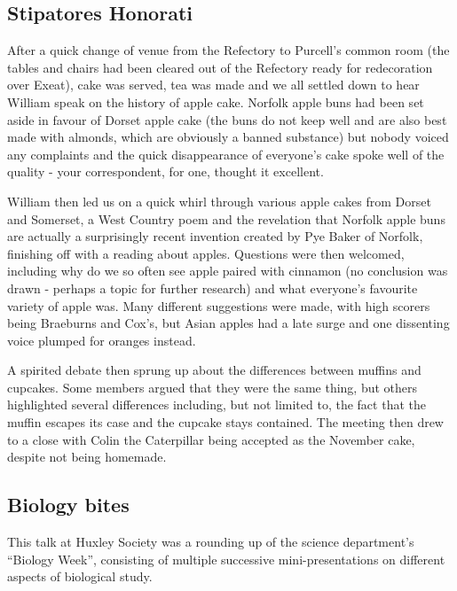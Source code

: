 \subsection{Stipatores Honorati}\label{stipatores-honorati}



	After a quick change of venue from the Refectory to Purcell's common
	room (the tables and chairs had been cleared out of the Refectory ready
	for redecoration over Exeat), cake was served, tea was made and we all
	settled down to hear William speak on the history of apple cake. Norfolk
	apple buns had been set aside in favour of Dorset apple cake (the buns
	do not keep well and are also best made with almonds, which are
	obviously a banned substance) but nobody voiced any complaints and the
	quick disappearance of everyone's cake spoke well of the quality - your
	correspondent, for one, thought it excellent.

	William then led us on a quick whirl through various apple cakes from
	Dorset and Somerset, a West Country poem and the revelation that Norfolk
	apple buns are actually a surprisingly recent invention created by Pye
	Baker of Norfolk, finishing off with a reading about apples. Questions
	were then welcomed, including why do we so often see apple paired with
	cinnamon (no conclusion was drawn - perhaps a topic for further
	research) and what everyone's favourite variety of apple was. Many
	different suggestions were made, with high scorers being Braeburns and
	Cox's, but Asian apples had a late surge and one dissenting voice
	plumped for oranges instead.

	A spirited debate then sprung up about the differences between muffins
	and cupcakes. Some members argued that they were the same thing, but
	others highlighted several differences including, but not limited to,
	the fact that the muffin escapes its case and the cupcake stays
	contained. The meeting then drew to a close with Colin the Caterpillar
	being accepted as the November cake, despite not being homemade.



\subsection{Biology bites}\label{biology-bites}



	This talk at Huxley Society was a rounding up of the science
	department's ``Biology Week'', consisting of multiple successive
	mini-presentations on different aspects of biological study.

